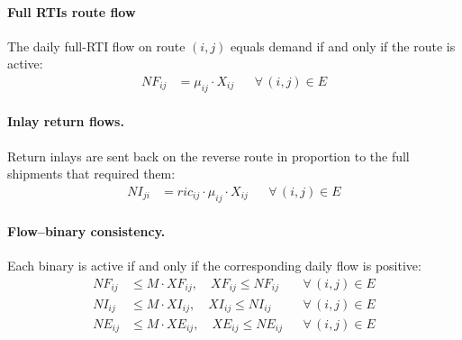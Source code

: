 
\paragraph{Full RTIs route flow}
The daily full-RTI flow on route $(i,j)$ equals demand if and only
if the route is active:
%
\begin{align}
  NF_{ij} &= \mu_{ij} \cdot X_{ij}
  && \forall\,(i,j)\in E
  \label{eq:demand}
\end{align}


\paragraph{Inlay return flows.}
Return inlays are sent back on the reverse route in proportion to
the full shipments that required them:
%
\begin{align}
  NI_{ji} &= ric_{ij} \cdot \mu_{ij} \cdot X_{ij}
  && \forall\,(i,j)\in E
  \label{eq:inlay}
\end{align}


\paragraph{Flow--binary consistency.}
Each binary is active if and only if the corresponding daily flow
is positive:
%
\begin{align}
  NF_{ij} &\leq M \cdot XF_{ij}, \quad XF_{ij} \leq NF_{ij}
  && \forall\,(i,j)\in E \label{eq:binary-full}\\
  NI_{ij} &\leq M \cdot XI_{ij}, \quad XI_{ij} \leq NI_{ij}
  && \forall\,(i,j)\in E \label{eq:binary-inlay}\\
  NE_{ij} &\leq M \cdot XE_{ij}, \quad XE_{ij} \leq NE_{ij}
  && \forall\,(i,j)\in E \label{eq:binary-empty}
\end{align}



